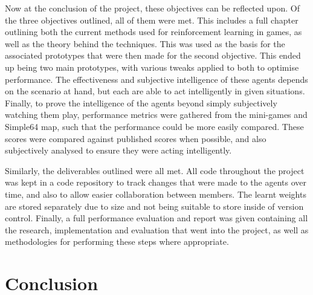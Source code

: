 Now at the conclusion of the project, these objectives can be reflected upon. Of
the three objectives outlined, all of them were met. This includes a full
chapter outlining both the current methods used for reinforcement learning in
games, as well as the theory behind the techniques. This was used as the basis
for the associated prototypes that were then made for the second objective. This
ended up being two main prototypes, with various tweaks applied to both to
optimise performance. The effectiveness and subjective intelligence of these
agents depends on the scenario at hand, but each are able to act intelligently
in given situations. Finally, to prove the intelligence of the agents beyond
simply subjectively watching them play, performance metrics were gathered from
the mini-games and Simple64 map, such that the performance could be more easily
compared. These scores were compared against published scores when possible, and
also subjectively analysed to ensure they were acting intelligently.

Similarly, the deliverables outlined were all met. All code throughout the
project was kept in a code repository to track changes that were made to the
agents over time, and also to allow easier collaboration between members. The
learnt weights are stored separately due to size and not being suitable to store
inside of version control. Finally, a full performance evaluation and report was
given containing all the research, implementation and evaluation that went into
the project, as well as methodologies for performing these steps where
appropriate.


\section{Conclusion}

